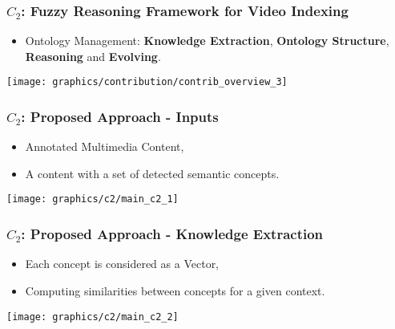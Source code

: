 \begin{frame}
	\frametitle{$C_{2}$: Fuzzy Reasoning Framework for Video Indexing}
	 {\small
	\begin{itemize}
	 
 	  \item Ontology Management: \textbf{\alert{Knowledge Extraction}}, 
 	  \textbf{\alert{Ontology Structure}}, \textbf{\alert{Reasoning}} and \textbf{\alert{Evolving}}.
	\end{itemize}
	}
	\begin{center}\hspace*{-1cm} \texttt{[image: graphics/contribution/contrib\_overview\_3]} \end{center}

\end{frame}

\begin{frame}
	\frametitle{$C_{2}$: Proposed Approach - Inputs}
	\begin{block}{}
	 \begin{itemize}
	  \item \alert{Annotated} Multimedia Content,
	  \item A \alert{content} with a set of detected semantic \alert{concepts}.
	 \end{itemize}
	\end{block}

	{\hspace*{-1cm}\centering\texttt{[image: graphics/c2/main\_c2\_1]}}
\end{frame}

\begin{frame}
	\frametitle{$C_{2}$: Proposed Approach - Knowledge Extraction}
	\begin{block}{}
	 \begin{itemize}
	  \item Each \alert{concept} is considered as a Vector,
	  \item Computing \alert{similarities} between concepts for a given context.
	 \end{itemize}
	\end{block}
	{\hspace*{-1cm}\centering\texttt{[image: graphics/c2/main\_c2\_2]}}
\end{frame}

